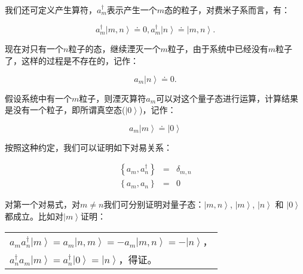 我们还可定义产生算符，$a_m^{\dagger}$表示产生一个$m$态的粒子，对费米子系而言，有：


\begin{equation*}
a_m^\dag  \left| {m,n} \right\rangle  \doteq 0, a_m^\dag  \left| n
\right\rangle \doteq \left| {m,n} \right\rangle .
\end{equation*}


现在对只有一个$n$粒子的态，继续湮灭一个$m$粒子，由于系统中已经没有$m$粒子了，这样的过程是不存在的，记作：

\begin{equation*}
a_m \left| n \right\rangle \doteq 0 .
\end{equation*}


假设系统中有一个$m$粒子，则湮灭算符$a_m$可以对这个量子态进行运算，计算结果是没有一个粒子，即所谓真空态($\left|
0 \right\rangle$)，记作：

\begin{equation}\label{eq 3}
a_m \left| m \right\rangle \doteq \left| 0 \right\rangle
\end{equation}


按照这种约定，我们可以证明如下对易关系：

\begin{eqnarray}
  \left\{ {a_m ,a_n^\dag  } \right\} &=& \delta _{m,n} \\
  \left\{
{a_m,a_n } \right\} &=& 0
\end{eqnarray}



对第一个对易式，对$m \ne n$我们可分别证明对量子态：$\left| {m,n}
\right\rangle$, $\left| m \right\rangle$, $\left| n \right\rangle$
和 $\left| 0 \right\rangle$都成立。比如对$\left| m
\right\rangle$证明：


\begin{center}
\begin{tabular}{|l|}
  \hline
  $a_m a_n^\dag  \left| m \right\rangle  = a_m \left| {n,m}
\right\rangle  =  - a_m \left| {m,n} \right\rangle  =  - \left| n
\right\rangle $，\\
$a_n^\dag  a_m \left| m \right\rangle  = a_n^\dag
\left| 0 \right\rangle  = \left| n \right\rangle $，得证。 \\
  \hline
\end{tabular}
\end{center}



